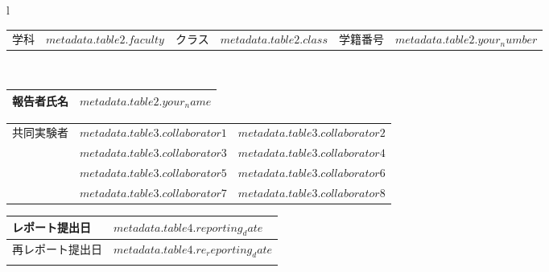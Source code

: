 \documentclass[$if(fontsize)$$fontsize$,$endif$$if(lang)$$babel-lang$,$endif$$if(papersize)$$papersize$,$endif$$for(classoption)$$classoption$$sep$,$endfor$]{$documentclass$}
\begin{document}
\begin{boldtabular}
  \begin{table}[!h]
    \hspace{-8pt}
    \begin{tabular}{l}
      \begin{tabularx}{\textwidth}{|l|m{50mm}|l|m{12mm}|l|X|}\hline
        \parbox[c][10mm][c]{0pt}{} 学科  & $metadata.table2.faculty$ & クラス & $metadata.table2.class$ & 学籍番号 & $metadata.table2.your_number$ \\
      \end{tabularx}\\

      \begin{tabularx}{\textwidth}{|l|X|}\hline
        \parbox[c][16mm][c]{0pt}{}\textbf{報告者氏名}  & \parbox[c][16mm][c]{\textwidth}{{\fontsize{20pt}{30pt}\selectfont\textbf{$metadata.table2.your_name$}}} \\ \hline
      \end{tabularx}
    \end{tabular}
  \end{table}
\end{boldtabular}

\vspace{10mm}

\begin{narrowtabular}
\begin{tabularx}{\textwidth}{|m{22mm}|X|X|}\hline
  \multirow{4}{ 22mm }{共同実験者} & $metadata.table3.collaborator1$ & $metadata.table3.collaborator2$ \\ \cline{2-3}
 & $metadata.table3.collaborator3$ & $metadata.table3.collaborator4$ \\ \cline{2-3}
& $metadata.table3.collaborator5$ & $metadata.table3.collaborator6$ \\ \cline{2-3}
& $metadata.table3.collaborator7$ & $metadata.table3.collaborator8$ \\ \hline
\end{tabularx}
\end{narrowtabular}

\vspace{10mm}

\begin{datetabular}
\begin{tabularx}{\textwidth}{|l|X|}\hline
レポート提出日 & $metadata.table4.reporting_date$ \\ \hline
再レポート提出日 & $metadata.table4.re_reporting_date$ \\ \hline
 &  \\ \hline
\end{tabularx}
\end{datetabular}
\end{document}
